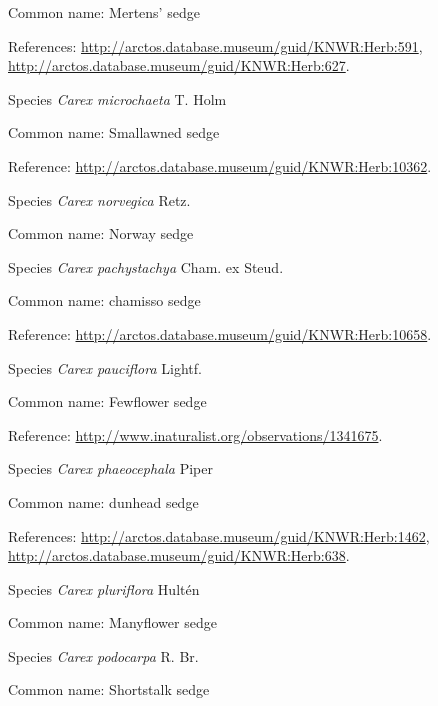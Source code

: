 \documentclass[9pt, article]{memoir}
\begin{document}
\begin{multicols}{2}
Common name: Mertens' sedge

References: 
\url{http://arctos.database.museum/guid/KNWR:Herb:591}, 
\url{http://arctos.database.museum/guid/KNWR:Herb:627}.

\vspace{6pt}\noindent\hspace{36pt}Species \textit{Carex microchaeta} T. Holm


Common name: Smallawned sedge

Reference: 
\url{http://arctos.database.museum/guid/KNWR:Herb:10362}.

\vspace{6pt}\noindent\hspace{36pt}Species \textit{Carex norvegica} Retz.


Common name: Norway sedge

\vspace{6pt}\noindent\hspace{36pt}Species \textit{Carex pachystachya} Cham. ex Steud.


Common name: chamisso sedge

Reference: 
\url{http://arctos.database.museum/guid/KNWR:Herb:10658}.

\vspace{6pt}\noindent\hspace{36pt}Species \textit{Carex pauciflora} Lightf.


Common name: Fewflower sedge

Reference: 
\url{http://www.inaturalist.org/observations/1341675}.

\vspace{6pt}\noindent\hspace{36pt}Species \textit{Carex phaeocephala} Piper


Common name: dunhead sedge

References: 
\url{http://arctos.database.museum/guid/KNWR:Herb:1462}, 
\url{http://arctos.database.museum/guid/KNWR:Herb:638}.

\vspace{6pt}\noindent\hspace{36pt}Species \textit{Carex pluriflora} Hultén


Common name: Manyflower sedge

\vspace{6pt}\noindent\hspace{36pt}Species \textit{Carex podocarpa} R. Br.


Common name: Shortstalk sedge


\end{multicols}
\end{document}
